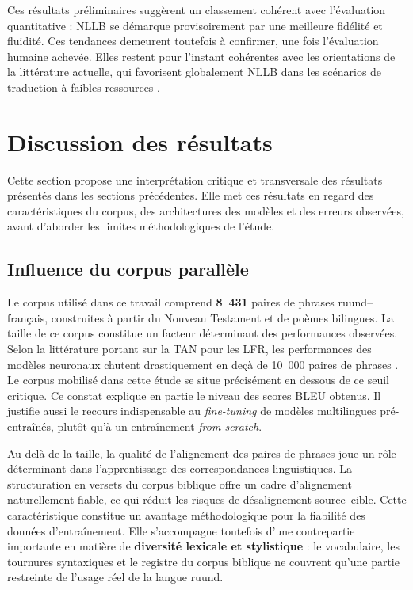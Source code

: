 Ces résultats préliminaires suggèrent un classement cohérent avec l'évaluation quantitative : \ac{NLLB} se démarque provisoirement par une meilleure fidélité et fluidité. Ces tendances demeurent toutefois à confirmer, une fois l'évaluation humaine achevée. Elles restent pour l'instant cohérentes avec les orientations de la littérature actuelle, qui favorisent globalement \ac{NLLB} dans les scénarios de traduction à faibles ressources \cite{ranathunga2023neural, agyei2025dynamic}.
\section{Discussion des résultats}
\label{sec:discussion-resultats}

Cette section propose une interprétation critique et transversale des résultats présentés dans les sections précédentes. Elle met ces résultats en regard des caractéristiques du corpus, des architectures des modèles et des erreurs observées, avant d'aborder les limites méthodologiques de l'étude.

\subsection{Influence du corpus parallèle}
\label{subsec:influence-corpus}

Le corpus utilisé dans ce travail comprend \textbf{8~431} paires de phrases ruund--français, construites à partir du Nouveau Testament et de poèmes bilingues. La taille de ce corpus constitue un facteur déterminant des performances observées. Selon la littérature portant sur la \ac{TAN} pour les \ac{LFR}, les performances des modèles neuronaux chutent drastiquement en deçà de 10~000 paires de phrases \cite{ranathunga2023neural}. Le corpus mobilisé dans cette étude se situe précisément en dessous de ce seuil critique. Ce constat explique en partie le niveau des scores \ac{BLEU} obtenus. Il justifie aussi le recours indispensable au \textit{fine-tuning} de modèles multilingues pré-entraînés, plutôt qu'à un entraînement \textit{from scratch}.

Au-delà de la taille, la qualité de l'alignement des paires de phrases joue un rôle déterminant dans l'apprentissage des correspondances linguistiques. La structuration en versets du corpus biblique offre un cadre d'alignement naturellement fiable, ce qui réduit les risques de désalignement source--cible. Cette caractéristique constitue un avantage méthodologique pour la fiabilité des données d'entraînement. Elle s'accompagne toutefois d'une contrepartie importante en matière de \textbf{diversité lexicale et stylistique} : le vocabulaire, les tournures syntaxiques et le registre du corpus biblique ne couvrent qu'une partie restreinte de l'usage réel de la langue ruund.

